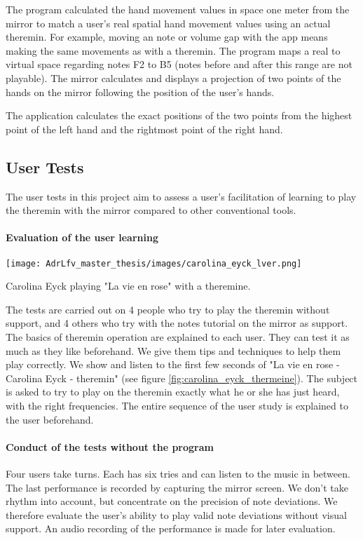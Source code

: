 The program calculated the hand movement values in space one meter from the mirror to match a user's real spatial hand movement values using an actual theremin. For example, moving an note or volume gap with the app means making the same movements as with a theremin. The program maps a real to virtual space regarding notes F2 to B5 (notes before and after this range are not playable). The mirror calculates and displays a projection of two points of the hands on the mirror following the position of the user's hands.

The application calculates the exact positions of the two points from the highest point of the left hand and the rightmost point of the right hand.

\subsection*{User Tests}

The user tests in this project aim to assess a user’s facilitation of learning to play the theremin with the mirror compared to other conventional tools.

\paragraph{Evaluation of the user learning}

\begin{marginfigure}
    \centering
    \texttt{[image: AdrLfv\_master\_thesis/images/carolina\_eyck\_lver.png]}
    \caption{Carolina Eyck playing "La vie en rose" with a theremine.}
    \label{fig:carolina_eyck_thermeine}
\end{marginfigure}

The tests are carried out on 4 people who try to play the theremin without support, and 4 others who try with the notes tutorial on the mirror as support.
The basics of theremin operation are explained to each user. They can test it as much as they like beforehand. We give them tips and techniques to help them play correctly. We show and listen to the first few seconds of "La vie en rose - Carolina Eyck - theremin" (see figure \ref{fig:carolina_eyck_thermeine}).
The subject is asked to try to play on the theremin exactly what he or she has just heard, with the right frequencies. 
The entire sequence of the user study is explained to the user beforehand.

\paragraph[]{Conduct of the tests without the program}
Four users take turns. Each has six tries and can listen to the music in between. The last performance is recorded by capturing the mirror screen. We don't take rhythm into account, but concentrate on the precision of note deviations. We therefore evaluate the user's ability to play valid note deviations without visual support. An audio recording of the performance is made for later evaluation.

